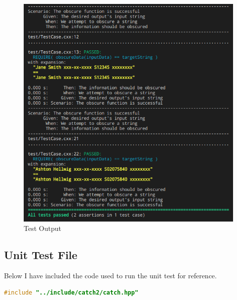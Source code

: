 \documentclass[a4paper, 11pt]{article}
\theoremstyle{definition}
\theoremstyle{plain}
\begin{document}
    \begin{figure}[H]
      \caption{Test Output}
      \centering
      \includegraphics[width=\textwidth]{testout.png}
    \end{figure}

    \newpage
    \subsection{Unit Test File}
      Below I have included the code used to run the unit test for reference.

      \begin{lstlisting}[language=c++,caption={TestCase.cxx}]
#include "../include/catch2/catch.hpp"
      \end{lstlisting}
\end{document}
